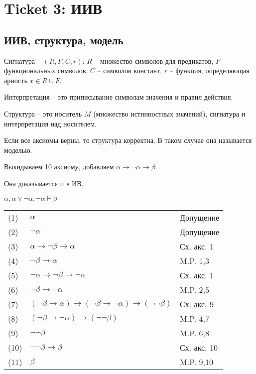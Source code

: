 \section{Ticket 3: ИИВ}
\label{sec-5}
\subsection{ИИВ, структура, модель}
\label{sec-5-1}

Сигнатура -- $(R, F, C, r)$: $R$ -- множество символов для предикатов, $F$ -- функциональных символов, $C$ -- символов констант, $r$ -- функция, определяющая арность $x \in R \cup F$. 

Интерпретация -- это приписывание символам значения и правил действия.

Структура -- это носитель $M$ (множество истинностных значений), сигнатура и интерпретация над носителем.

Если все аксиомы верны, то структура корректна.
В таком случае она называется моделью.

Выкидываем 10 аксиому, добавляем $\alpha \rightarrow \neg \alpha \rightarrow \beta$.

Она доказывается и в ИВ.
\begin{lemma} 
$\alpha, \alpha \vee \neg \alpha, \neg \alpha \vdash \beta$
\end{lemma}
\begin{tabular}{lll}
(1) & $\alpha$& Допущение\\
(2) & $\neg \alpha$& Допущение\\
(3) & $\alpha \rightarrow \neg \beta \rightarrow \alpha$& Сх. акс. 1\\
(4) & $\neg \beta \rightarrow \alpha$& M.P. 1,3\\
(5) & $\neg \alpha \rightarrow \neg \beta \rightarrow \neg \alpha$& Сх. акс. 1\\
(6) & $\neg \beta \rightarrow \neg \alpha$& M.P. 2,5\\
(7) & $(\neg \beta \rightarrow \alpha) \rightarrow (\neg \beta \rightarrow \neg \alpha) \rightarrow (\neg \neg \beta)$& Сх. акс. 9\\
(8) & $(\neg \beta \rightarrow \neg \alpha) \rightarrow (\neg \neg \beta)$& M.P. 4,7\\
(9) & $\neg \neg \beta$& M.P. 6,8\\
(10) & $\neg \neg \beta \rightarrow \beta$& Сх. акс. 10\\
(11) & $\beta$& M.P. 9,10\\
\end{tabular}


